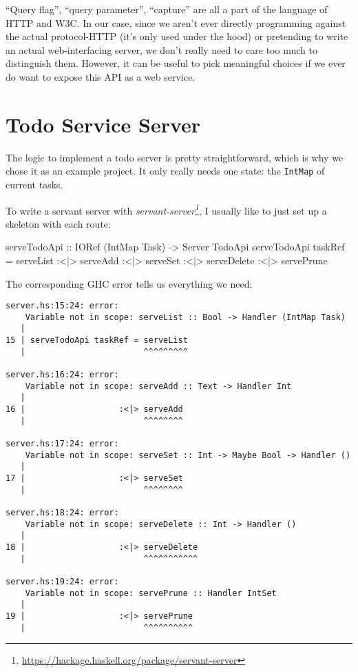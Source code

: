 \documentclass[]{article}
\newenvironment{Shaded}{}{}
\newcommand{\DataTypeTok}[1]{\textcolor[rgb]{0.56,0.13,0.00}{#1}}
\newcommand{\NormalTok}[1]{#1}
\newcommand{\OperatorTok}[1]{\textcolor[rgb]{0.40,0.40,0.40}{#1}}
\newcommand{\OtherTok}[1]{\textcolor[rgb]{0.00,0.44,0.13}{#1}}
\renewcommand{\href}[2]{#2\footnote{\url{#1}}}
\begin{document}
``Query flag'', ``query parameter'', ``capture'' are all a part of the language
of HTTP and W3C. In our case, since we aren't ever directly programming against
the actual protocol-HTTP (it's only used under the hood) or pretending to write
an actual web-interfacing server, we don't really need to care too much to
distinguish them. However, it can be useful to pick meaningful choices if we
ever do want to expose this API as a web service.

\hypertarget{todo-service-server}{%
\section{Todo Service Server}\label{todo-service-server}}

The logic to implement a todo server is pretty straightforward, which is why we
chose it as an example project. It only really needs one state: the
\texttt{IntMap} of current tasks.

To write a servant server with
\emph{\href{https://hackage.haskell.org/package/servant-server}{servant-server}},
I usually like to just set up a skeleton with each route:

\begin{Shaded}
\begin{Highlighting}[]
\OtherTok{serveTodoApi ::} \DataTypeTok{IORef}\NormalTok{ (}\DataTypeTok{IntMap} \DataTypeTok{Task}\NormalTok{) }\OtherTok{{-}>} \DataTypeTok{Server} \DataTypeTok{TodoApi}
\NormalTok{serveTodoApi taskRef }\OtherTok{=}\NormalTok{ serveList}
                  \OperatorTok{:<|>}\NormalTok{ serveAdd}
                  \OperatorTok{:<|>}\NormalTok{ serveSet}
                  \OperatorTok{:<|>}\NormalTok{ serveDelete}
                  \OperatorTok{:<|>}\NormalTok{ servePrune}
\end{Highlighting}
\end{Shaded}

The corresponding GHC error tells us everything we need:

\begin{verbatim}
server.hs:15:24: error:
    Variable not in scope: serveList :: Bool -> Handler (IntMap Task)
   |
15 | serveTodoApi taskRef = serveList
   |                        ^^^^^^^^^

server.hs:16:24: error:
    Variable not in scope: serveAdd :: Text -> Handler Int
   |
16 |                   :<|> serveAdd
   |                        ^^^^^^^^

server.hs:17:24: error:
    Variable not in scope: serveSet :: Int -> Maybe Bool -> Handler ()
   |
17 |                   :<|> serveSet
   |                        ^^^^^^^^

server.hs:18:24: error:
    Variable not in scope: serveDelete :: Int -> Handler ()
   |
18 |                   :<|> serveDelete
   |                        ^^^^^^^^^^^

server.hs:19:24: error:
    Variable not in scope: servePrune :: Handler IntSet
   |
19 |                   :<|> servePrune
   |                        ^^^^^^^^^^
\end{verbatim}
\end{document}
